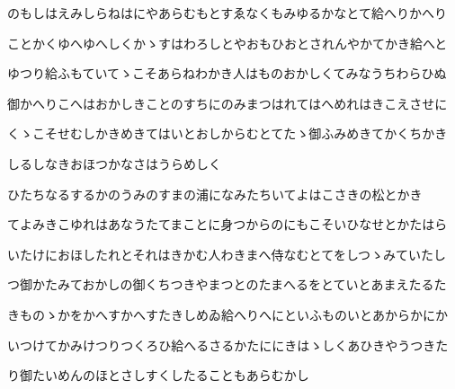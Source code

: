 \documentclass[a4paper,11pt,landscape]{ltjtarticle}
\begin{document}
\par\medskip
のもしはえみしらねはにやあらむもとすゑなくもみゆるかなとて給へりかへり
\par\medskip
ことかくゆへゆへしくかゝすはわろしとやおもひおとされんやかてかき給へと
\par\medskip
ゆつり給ふもていてゝこそあらねわかき人はものおかしくてみなうちわらひぬ
\par\medskip
御かへりこへはおかしきことのすちにのみまつはれてはへめれはきこえさせに
\par\medskip
くゝこそせむしかきめきてはいとおしからむとてたゝ御ふみめきてかくちかき
\par\medskip
しるしなきおほつかなさはうらめしく
\par\medskip
ひたちなるするかのうみのすまの浦になみたちいてよはこさきの松とかき
\par\medskip
てよみきこゆれはあなうたてまことに身つからのにもこそいひなせとかたはら
\par\medskip
いたけにおほしたれとそれはきかむ人わきまへ侍なむとてをしつゝみていたし
\par\medskip
つ御かたみておかしの御くちつきやまつとのたまへるをとていとあまえたるた
\par\medskip
きものゝかをかへすかへすたきしめゐ給へりへにといふものいとあからかにか
\par\medskip
いつけてかみけつりつくろひ給へるさるかたににきはゝしくあひきやうつきた
\par\medskip
り御たいめんのほとさしすくしたることもあらむかし
\par\medskip
\end{document}
